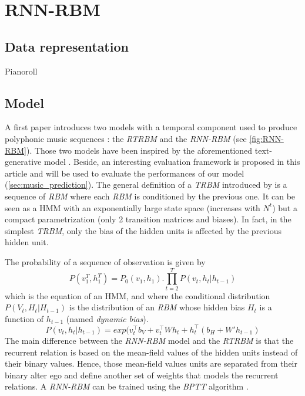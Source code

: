 \documentclass{report}
\begin{document}
\section{RNN-RBM}
\subsection{Data representation}
Pianoroll
\subsection{Model}
A first paper \cite{boulanger2012modeling} introduces two models with a temporal component used to produce polyphonic music sequences : the \textit{RTRBM} and the \textit{RNN-RBM} (see \ref{fig:RNN-RBM}). Those two models have been inspired by the aforementioned text-generative model \cite{sutskever2011generating}. Beside, an interesting evaluation framework is proposed in this article and will be used to evaluate the performances of our model (\ref{sec:music_prediction}).
The general definition of a \textit{TRBM} introduced by \cite{sutskever2009recurrent} is a sequence of \textit{RBM} where each \textit{RBM} is conditioned by the previous one. It can be seen as a HMM with an exponentially large state space (increases with $N^{t}$) but a compact parametrization (only 2 transition matrices and biases). In fact, in the simplest \textit{TRBM}, only the bias of the hidden units is affected by the previous hidden unit.

The probability of a sequence of observation is given by
\begin{equation}
P(v_{1}^{T},h_{1}^{T}) = P_{0}(v_{1},h_{1}) . \prod_{t=2}^{T} P(v_{t},h_{t}|h_{t-1})
\end{equation}
which is the equation of an HMM, and where the conditional distribution $P(V_{t},H_{t}|H_{t-1})$ is the distribution of an \textit{RBM} whose hidden bias $H_{t}$ is a function of $h_{t-1}$ (named \textit{dynamic bias}).
\begin{equation}
P(v_{t},h_{t}|h_{t-1}) = exp(v_{t}^{\top}b_{V} + v_{t}^{\top} W h_{t} + h_{t}^{\top}(b_{H} + W'h_{t-1})
\end{equation}
The main difference between the \textit{RNN-RBM} model and the \textit{RTRBM} is that the recurrent relation is based on the mean-field values of the hidden units instead of their binary values. Hence, those mean-field values units are separated from their binary alter ego and define another set of weights that models the recurrent relations.
A \textit{RNN-RBM} can be trained using the \textit{BPTT} algorithm \cite{rumelhart1985learning}.
\end{document}
